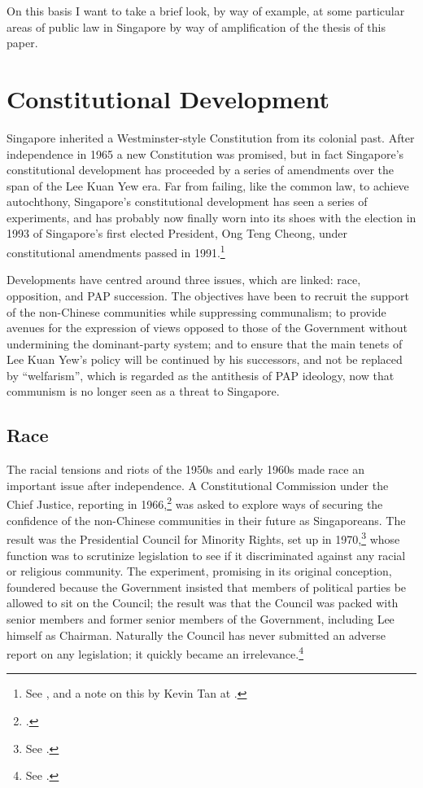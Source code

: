 On this basis I want to take a brief look, by way of example, at
some particular areas of public law in Singapore by way of
amplification of the thesis of this paper.


\section{Constitutional Development}

Singapore inherited a Westminster-style Constitution from its
colonial past. After independence in 1965 a new Constitution was
promised, but in fact Singapore's constitutional development has
proceeded by a series of amendments over the span of the Lee Kuan
Yew era. Far from failing, like the common law, to achieve
autochthony, Singapore's constitutional development has seen a
series of experiments, and has probably now finally worn into its
shoes with the election in 1993 of Singapore's first elected
President, Ong Teng Cheong, under constitutional amendments
passed in 1991.\footnote{See , and a
  note on this by Kevin Tan at .}

Developments have centred around three issues, which are linked:
race, opposition, and PAP succession. The objectives have been to
recruit the support of the non-Chinese communities while
suppressing communalism; to provide avenues for the expression of
views opposed to those of the Government without undermining the
dominant-party system; and to ensure that the main tenets of Lee
Kuan Yew's policy will be continued by his successors, and not be
replaced by ``welfarism'', which is regarded as the antithesis of
PAP ideology, now that communism is no longer seen as a threat to
Singapore.

\subsection{Race}
The racial tensions and riots of the 1950s and early 1960s made
race an important issue after independence. A Constitutional
Commission under the Chief Justice, reporting in 1966,\footnote{
  .} was asked to explore ways of
securing the confidence of the non-Chinese communities in their
future as Singaporeans. The result was the Presidential Council
for Minority Rights, set up in 1970,\footnote{ See
  .} whose function was to scrutinize
legislation to see if it discriminated against any racial or
religious community. The experiment, promising in its original
conception, foundered because the Government insisted that
members of political parties be allowed to sit on the Council;
the result was that the Council was packed with senior members
and former senior members of the Government, including Lee
himself as Chairman. Naturally the Council has never submitted an
adverse report on any legislation; it quickly became an
irrelevance.\footnote{ See .}


